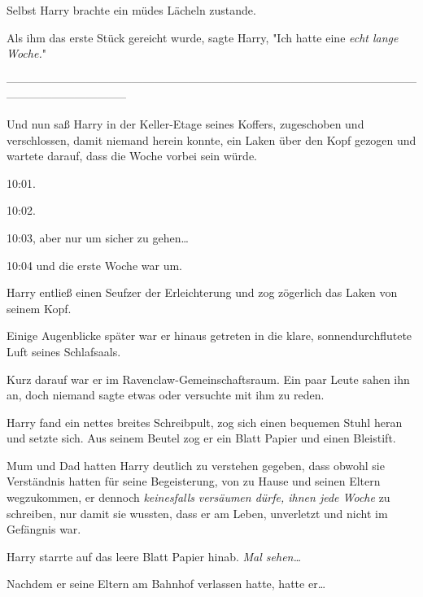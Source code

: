 {Selbst Harry brachte ein müdes Lächeln zustande.

Als ihm das erste Stück gereicht wurde, sagte Harry, "Ich hatte eine \emph{echt lange Woche.}"

--------------------------------------------------------------------------------------------------------------------------------------------

Und nun saß Harry in der Keller-Etage seines Koffers, zugeschoben und verschlossen, damit niemand herein konnte, ein Laken über den Kopf gezogen und wartete darauf, dass die Woche vorbei sein würde.

10:01.

10:02.

10:03, aber nur um sicher zu gehen…

10:04 und die erste Woche war um.

Harry entließ einen Seufzer der Erleichterung und zog zögerlich das Laken von seinem Kopf.

Einige Augenblicke später war er hinaus getreten in die klare, sonnendurchflutete Luft seines Schlafsaals.

Kurz darauf war er im Ravenclaw-Gemeinschaftsraum. Ein paar Leute sahen ihn an, doch niemand sagte etwas oder versuchte mit ihm zu reden.

Harry fand ein nettes breites Schreibpult, zog sich einen bequemen Stuhl heran und setzte sich. Aus seinem Beutel zog er ein Blatt Papier und einen Bleistift.

Mum und Dad hatten Harry deutlich zu verstehen gegeben, dass obwohl sie Verständnis hatten für seine Begeisterung, von zu Hause und seinen Eltern wegzukommen, er dennoch \emph{keinesfalls} \emph{versäumen dürfe, ihnen jede Woche} zu schreiben, nur damit sie wussten, dass er am Leben, unverletzt und nicht im Gefängnis war.

Harry starrte auf das leere Blatt Papier hinab. \emph{Mal sehen…}

Nachdem er seine Eltern am Bahnhof verlassen hatte, hatte er…

}
